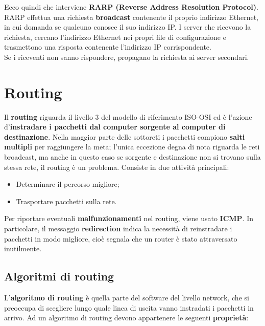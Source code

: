 \documentclass{article}
\begin{document}
        Ecco quindi che interviene \textbf{RARP (Reverse Address Resolution Protocol)}. RARP effettua una
        richiesta \textbf{broadcast} contenente il proprio indirizzo Ethernet, in cui domanda se qualcuno
        conosce il suo indirizzo IP. I server che ricevono la richiesta, cercano l’indirizzo Ethernet nei
        propri file di configurazione e trasmettono una risposta contenente l’indirizzo IP
        corrispondente.\\

        Se i riceventi non sanno rispondere, propagano la richiesta ai server secondari.
        
    \section{Routing}
    Il \textbf{routing} riguarda il livello 3 del modello di riferimento ISO-OSI ed è l’azione d’\textbf{instradare i
    pacchetti dal computer sorgente al computer di destinazione}. Nella maggior parte delle
    sottoreti i pacchetti compiono \textbf{salti multipli} per raggiungere la meta; l’unica eccezione degna
    di nota riguarda le reti broadcast, ma anche in questo caso se sorgente e destinazione non si
    trovano sulla stessa rete, il routing è un problema. Consiste in due attività principali:\\
    
    \begin{itemize}
        \item Determinare il percorso migliore;
        \item Trasportare pacchetti sulla rete.
    \end{itemize}

    Per riportare eventuali \textbf{malfunzionamenti} nel routing, viene usato \textbf{ICMP}. In particolare, il
    messaggio \textbf{redirection} indica la necessità di reinstradare i pacchetti in modo migliore, cioè
    segnala che un router è stato attraversato inutilmente.

        \subsection{Algoritmi di routing}
        L’\textbf{algoritmo di routing} è quella parte del software del livello network, che si preoccupa di
        scegliere lungo quale linea di uscita vanno instradati i pacchetti in arrivo.
        Ad un algoritmo di routing devono appartenere le seguenti \textbf{proprietà}:
        
\end{document}
